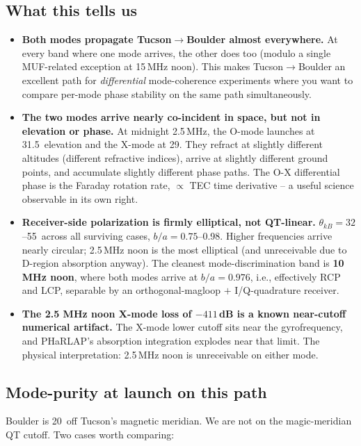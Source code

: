 \documentclass[11pt]{article}
\begin{document}
\subsection*{What this tells us}

\begin{itemize}
\item \textbf{Both modes propagate Tucson$\to$Boulder almost
everywhere.}  At every band where one mode arrives, the other does
too (modulo a single MUF-related exception at 15\,MHz noon).  This
makes Tucson$\to$Boulder an excellent path for \emph{differential}
mode-coherence experiments where you want to compare per-mode phase
stability on the same path simultaneously.

\item \textbf{The two modes arrive nearly co-incident in space, but
not in elevation or phase.}  At midnight 2.5\,MHz, the O-mode
launches at 31.5\textdegree\ elevation and the X-mode at 29\textdegree.
They refract at slightly different altitudes (different refractive
indices), arrive at slightly different ground points, and accumulate
slightly different phase paths.  The O-X differential phase is the
Faraday rotation rate, $\propto$ TEC time derivative -- a useful
science observable in its own right.

\item \textbf{Receiver-side polarization is firmly elliptical, not
QT-linear.}  $\theta_{kB} = 32$--55\textdegree\ across all surviving
cases, $b/a = 0.75$--0.98.  Higher frequencies arrive nearly circular;
2.5\,MHz noon is the most elliptical (and unreceivable due to
D-region absorption anyway).  The cleanest mode-discrimination band
is \textbf{10\,MHz noon}, where both modes arrive at $b/a=0.976$,
i.e., effectively RCP and LCP, separable by an orthogonal-magloop
$+$ I/Q-quadrature receiver.

\item \textbf{The 2.5 MHz noon X-mode loss of $-411$\,dB is a known
near-cutoff numerical artifact.}  The X-mode lower cutoff sits near
the gyrofrequency, and PHaRLAP's absorption integration explodes near
that limit.  The physical interpretation: 2.5\,MHz noon is
unreceivable on either mode.
\end{itemize}

\subsection*{Mode-purity at launch on this path}

Boulder is 20\textdegree\ off Tucson's magnetic meridian.  We are not
on the magic-meridian QT cutoff.  Two cases worth comparing:
\end{document}
